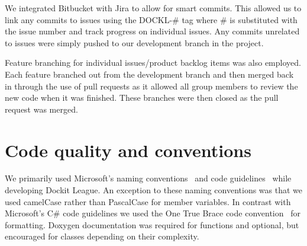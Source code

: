 We integrated Bitbucket with Jira to allow for smart commits. This allowed us to link any commits to issues using the DOCKL-\# tag where \# is substituted with the issue number and track progress on individual issues. Any commits unrelated to issues were simply pushed to our development branch in the project. 
    
Feature branching for individual issues/product backlog items was also employed. Each feature branched out from the development branch and then merged back in through the use of pull requests as it allowed all group members to review the new code when it was finished. These branches were then closed as the pull request was merged. 

\section{Code quality and conventions}
We primarily used Microsoft's naming conventions~\cite{microsoftNamingGuidelines} and code guidelines~\cite{microsoftCodeGuidelines} while developing Dockit League. An exception to these naming conventions was that we used camelCase rather than PascalCase for member variables. In contrast with Microsoft's C\# code guidelines we used the One True Brace code convention~\cite{oneTrueBraceStyle} for formatting. 
Doxygen documentation was required for functions and optional, but encouraged for classes depending on their complexity.